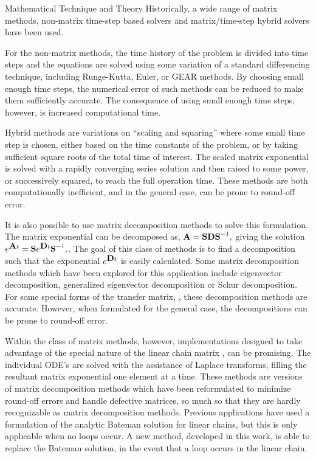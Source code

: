 \begin{chapter}{Mathematical Technique and Theory\label{chap:math}}
  Historically, a wide range of matrix methods, non-matrix time-step
  based solvers and matrix/time-step hybrid solvers have been used.
  
  For the non-matrix methods, the time history of the problem is
  divided into time steps and the equations are solved using some
  variation of a standard differencing technique, including
  Runge-Kutta, Euler, or GEAR methods.  By choosing small enough time
  steps, the numerical error of such methods can be reduced to make
  them sufficiently accurate.  The consequence of using small enough
  time steps, however, is increased computational time.
  
  Hybrid methods are variations on ``scaling and squaring'' where some
  small time step is chosen, either based on the time constants of the
  problem, or by taking sufficient square roots of the total time of
  interest.  The scaled matrix exponential is solved with a rapidly
  converging series solution and then raised to some power, or
  successively squared, to reach the full operation time.  These
  methods are both computationally inefficient, and in the general
  case, can be prone to round-off error.
  
  It is also possible to use matrix decomposition methods to solve
  this formulation.  The matrix exponential can be decomposed as,
  $\mbox{$\mathbf{A}$} = \mbox{$\mathbf{S}$}\mbox{$\mathbf{D}$}\mbox{$\mathbf{S}$}^{-1},$ giving the solution
  $e^{\mbox{$\mathbf{A}$} t} = \mbox{$\mathbf{S}$}e^{\mbox{$\mathbf{D}$} t}\mbox{$\mathbf{S}$}^{-1},$.  The goal of
  this class of methods is to find a decomposition such that the
  exponential $e^{\mbox{$\mathbf{D}$} t}$ is easily calculated. Some matrix
  decomposition methods which have been explored for this application
  include eigenvector decomposition\cite{eigenvectors}, generalized
  eigenvector decomposition\cite{GERAPH} or Schur
  decomposition\cite{RACCP}.  For some special forms of the transfer
  matrix, , these decomposition methods are accurate.  However,
  when formulated for the general case, the decompositions can be
  prone to round-off error.
  
  Within the class of matrix methods, however, implementations
  designed to take advantage of the special nature of the linear chain
  matrix , can be promising.  The individual ODE's are solved
  with the assistance of Laplace transforms, filling the resultant
  matrix exponential one element at a time.  These methods are
  versions of matrix decomposition methods which have been
  reformulated to minimize round-off errors and handle defective
  matrices, so much so that they are hardly recognizable as matrix
  decomposition methods.  Previous applications have used a
  formulation of the analytic Bateman\cite{DKR,DKRICF,DKRP} solution
  for linear chains, but this is only applicable when no loops occur.
  A new method, developed in this work, is able to replace the Bateman
  solution, in the event that a loop occurs in the linear chain.
  

\end{chapter}
